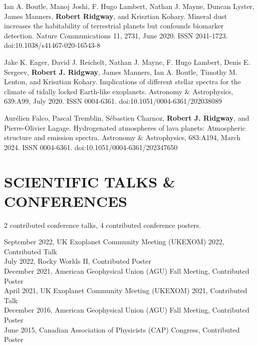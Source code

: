 \documentclass[letter, margin, 10pt]{res} %
\begin{document}
\begin{resume}
Ian A. Boutle, Manoj Joshi, F. Hugo Lambert, Nathan J. Mayne, Duncan Lyster, James Manners, \textbf{Robert Ridgway}, and Krisztian Kohary. Mineral dust increases the habitability of terrestrial planets but confounds biomarker detection. Nature Communications 11, 2731, June 2020. ISSN 2041-1723. doi:10.1038/s41467-020-16543-8

Jake K. Eager, David J. Reichelt, Nathan J. Mayne, F. Hugo Lambert, Denis E. Sergeev, \textbf{Robert J. Ridgway}, James Manners, Ian A. Boutle, Timothy M. Lenton, and Krisztian Kohary. Implications of different stellar spectra for the climate of tidally locked Earth-like exoplanets. Astronomy \& Astrophysics, 639:A99, July 2020. ISSN 0004-6361. doi:10.1051/0004-6361/202038089

Aur\'{e}lien Falco, Pascal Tremblin, S\'{e}bastien Charnoz, \textbf{Robert J. Ridgway}, and Pierre-Olivier Lagage. Hydrogenated atmospheres of lava planets: Atmospheric structure and emission spectra. Astronomy \& Astrophysics, 683:A194, March 2024. ISSN 0004-6361. doi:10.1051/0004-6361/202347650



\parskip \baselineskip
\vspace{-6pt}
\section{SCIENTIFIC TALKS \& CONFERENCES}
2 contributed conference talks, 4 contributed conference posters.

\vspace{-4pt}
September 2022, UK Exoplanet Community Meeting (UKEXOM) 2022, Contributed Talk \\
July 2022, Rocky Worlds II, Contributed Poster \\
December 2021, American Geophysical Union (AGU) Fall Meeting, Contributed Poster\\
April 2021, UK Exoplanet Community Meeting (UKEXOM) 2021, Contributed Talk\\
December 2016, American Geophysical Union (AGU) Fall Meeting, Contributed Poster\\
June 2015, Canadian Association of Physicists (CAP) Congress, Contributed Poster


\end{resume}
\end{document}
